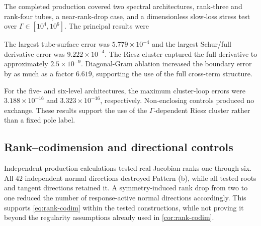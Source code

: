 \documentclass[11pt]{article}
\theoremstyle{definition}
\theoremstyle{remark}
\begin{document}
The completed production covered two spectral architectures, rank-three and rank-four tubes, a near-rank-drop case, and a dimensionless slow-loss stress test over $\Gamma\in[10^4,10^6]$. The principal results were
\begin{center}
\end{center}
The largest tube-surface error was $5.779\times10^{-4}$ and the largest Schur/full derivative error was $9.222\times10^{-4}$. The Riesz cluster captured the full derivative to approximately $2.5\times10^{-9}$. Diagonal-Gram ablation increased the boundary error by as much as a factor $6.619$, supporting the use of the full cross-term structure.

For the five- and six-level architectures, the maximum cluster-loop errors were $3.188\times10^{-16}$ and $3.323\times10^{-16}$, respectively. Non-enclosing controls produced no exchange. These results support the use of the $\Gamma$-dependent Riesz cluster rather than a fixed pole label.

\subsection{Rank--codimension and directional controls}

Independent production calculations tested real Jacobian ranks one through six. All $42$ independent normal directions destroyed Pattern (b), while all tested roots and tangent directions retained it. A symmetry-induced rank drop from two to one reduced the number of response-active normal directions accordingly. This supports \eqref{eq:rank-codim} within the tested constructions, while not proving it beyond the regularity assumptions already used in \cref{cor:rank-codim}.
\end{document}
